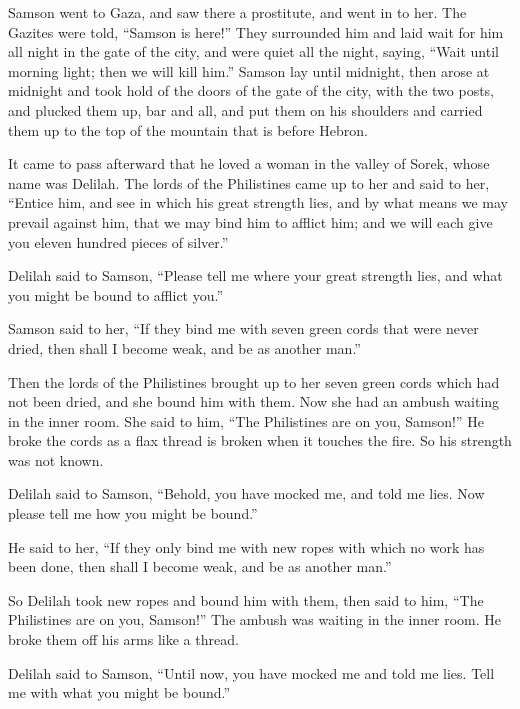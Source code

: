  Samson went to Gaza, and saw there a prostitute, and went
in to her.  The Gazites were told, ``Samson is here!''
They surrounded him and laid wait for him all night in the gate of the
city, and were quiet all the night, saying, ``Wait until morning light;
then we will kill him.''  Samson lay until midnight, then
arose at midnight and took hold of the doors of the gate of the city,
with the two posts, and plucked them up, bar and all, and put them on
his shoulders and carried them up to the top of the mountain that is
before Hebron.

 It came to pass afterward that he loved a woman in the
valley of Sorek, whose name was Delilah.  The lords of the
Philistines came up to her and said to her, ``Entice him, and see in
which his great strength lies, and by what means we may prevail against
him, that we may bind him to afflict him; and we will each give you
eleven hundred pieces of silver.''

 Delilah said to Samson, ``Please tell me where your great
strength lies, and what you might be bound to afflict you.''

 Samson said to her, ``If they bind me with seven green
cords that were never dried, then shall I become weak, and be as another
man.''

 Then the lords of the Philistines brought up to her seven
green cords which had not been dried, and she bound him with them.
 Now she had an ambush waiting in the inner room. She said
to him, ``The Philistines are on you, Samson!'' He broke the cords as a
flax thread is broken when it touches the fire. So his strength was not
known.

 Delilah said to Samson, ``Behold, you have mocked me,
and told me lies. Now please tell me how you might be bound.''

 He said to her, ``If they only bind me with new ropes
with which no work has been done, then shall I become weak, and be as
another man.''

 So Delilah took new ropes and bound him with them, then
said to him, ``The Philistines are on you, Samson!'' The ambush was
waiting in the inner room. He broke them off his arms like a thread.

 Delilah said to Samson, ``Until now, you have mocked me
and told me lies. Tell me with what you might be bound.''

